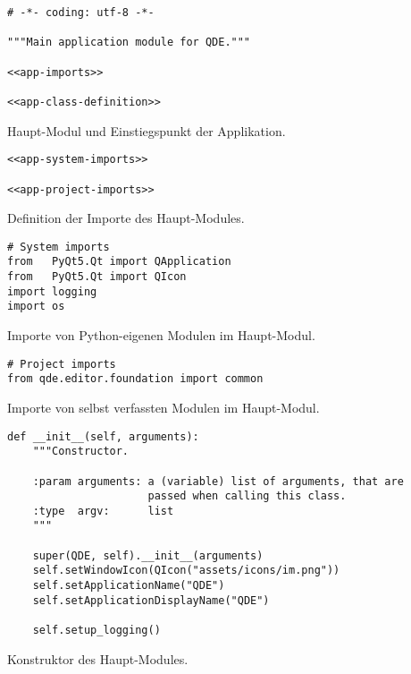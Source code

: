 \documentclass[10pt, openright, notitlepage]{scrreprt}
\begin{document}
\begin{listing}[H]
\begin{verbatim}
# -*- coding: utf-8 -*-

"""Main application module for QDE."""

<<app-imports>>

<<app-class-definition>>
\end{verbatim}
\caption{Haupt-Modul und Einstiegspunkt der Applikation.}
\end{listing}

\begin{listing}[H]
\begin{verbatim}
<<app-system-imports>>

<<app-project-imports>>
\end{verbatim}
\caption{\label{org1c83ef7}
Definition der Importe des Haupt-Modules.}
\end{listing}

\begin{listing}[H]
\begin{verbatim}
# System imports
from   PyQt5.Qt import QApplication
from   PyQt5.Qt import QIcon
import logging
import os
\end{verbatim}
\caption{\label{orgb8719d4}
Importe von Python-eigenen Modulen im Haupt-Modul.}
\end{listing}

\begin{listing}[H]
\begin{verbatim}
# Project imports
from qde.editor.foundation import common
\end{verbatim}
\caption{\label{orgd5c3ab0}
Importe von selbst verfassten Modulen im Haupt-Modul.}
\end{listing}

\begin{listing}[H]
\begin{verbatim}
def __init__(self, arguments):
    """Constructor.

    :param arguments: a (variable) list of arguments, that are
                      passed when calling this class.
    :type  argv:      list
    """

    super(QDE, self).__init__(arguments)
    self.setWindowIcon(QIcon("assets/icons/im.png"))
    self.setApplicationName("QDE")
    self.setApplicationDisplayName("QDE")

    self.setup_logging()
\end{verbatim}
\caption{\label{org770f684}
Konstruktor des Haupt-Modules.}
\end{listing}
\end{document}
